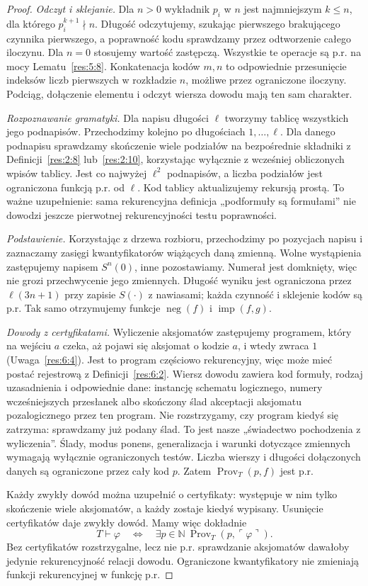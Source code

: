 \documentclass[11pt,a4paper]{article}
\numberwithin{equation}{section}
\theoremstyle{plain}
\theoremstyle{definition}
\theoremstyle{remark}
\begin{document}
\begin{proof}
\emph{Odczyt i sklejanie.} Dla $n>0$ wykładnik $p_i$ w $n$ jest najmniejszym $k\le n$, dla którego $p_i^{k+1}\nmid n$. Długość odczytujemy, szukając pierwszego brakującego czynnika pierwszego, a poprawność kodu sprawdzamy przez odtworzenie całego iloczynu. Dla $n=0$ stosujemy wartość zastępczą. Wszystkie te operacje są p.r. na mocy Lematu~\ref{res:5:8}. Konkatenacja kodów $m,n$ to odpowiednie przesunięcie indeksów liczb pierwszych w rozkładzie $n$, możliwe przez ograniczone iloczyny. Podciąg, dołączenie elementu i odczyt wiersza dowodu mają ten sam charakter.

\emph{Rozpoznawanie gramatyki.} Dla napisu długości $\ell$ tworzymy tablicę wszystkich jego podnapisów. Przechodzimy kolejno po długościach $1,\ldots,\ell$. Dla danego podnapisu sprawdzamy skończenie wiele podziałów na bezpośrednie składniki z Definicji~\ref{res:2:8} lub~\ref{res:2:10}, korzystając wyłącznie z wcześniej obliczonych wpisów tablicy. Jest co najwyżej $\ell^2$ podnapisów, a liczba podziałów jest ograniczona funkcją p.r. od $\ell$. Kod tablicy aktualizujemy rekursją prostą. To ważne uzupełnienie: sama rekurencyjna definicja „podformuły są formułami” nie dowodzi jeszcze pierwotnej rekurencyjności testu poprawności.

\emph{Podstawienie.} Korzystając z drzewa rozbioru, przechodzimy po pozycjach napisu i zaznaczamy zasięgi kwantyfikatorów wiążących daną zmienną. Wolne wystąpienia zastępujemy napisem $S^n(0)$, inne pozostawiamy. Numerał jest domknięty, więc nie grozi przechwycenie jego zmiennych. Długość wyniku jest ograniczona przez $\ell(3n+1)$ przy zapisie $S(\cdot)$ z nawiasami; każda czynność i sklejenie kodów są p.r. Tak samo otrzymujemy funkcje $\operatorname{neg}(f)$ i $\operatorname{imp}(f,g)$.

\emph{Dowody z certyfikatami.} Wyliczenie aksjomatów zastępujemy programem, który na wejściu $a$ czeka, aż pojawi się aksjomat o kodzie $a$, i wtedy zwraca $1$ (Uwaga~\ref{res:6:4}). Jest to program częściowo rekurencyjny, więc może mieć postać rejestrową z Definicji~\ref{res:6:2}. Wiersz dowodu zawiera kod formuły, rodzaj uzasadnienia i odpowiednie dane: instancję schematu logicznego, numery wcześniejszych przesłanek albo skończony ślad akceptacji aksjomatu pozalogicznego przez ten program. Nie rozstrzygamy, czy program kiedyś się zatrzyma: sprawdzamy już podany ślad. To jest nasze „świadectwo pochodzenia z wyliczenia”. Ślady, modus ponens, generalizacja i warunki dotyczące zmiennych wymagają wyłącznie ograniczonych testów. Liczba wierszy i długości dołączonych danych są ograniczone przez cały kod $p$. Zatem $\operatorname{Prov}_T(p,f)$ jest p.r.

Każdy zwykły dowód można uzupełnić o certyfikaty: występuje w nim tylko skończenie wiele aksjomatów, a każdy zostaje kiedyś wypisany. Usunięcie certyfikatów daje zwykły dowód. Mamy więc dokładnie
\[
T\vdash\varphi\quad\Longleftrightarrow\quad\exists p\in\mathbb N\ \operatorname{Prov}_T(p,\ulcorner\varphi\urcorner).
\]
Bez certyfikatów rozstrzygalne, lecz nie p.r. sprawdzanie aksjomatów dawałoby jedynie rekurencyjność relacji dowodu. Ograniczone kwantyfikatory nie zmieniają funkcji rekurencyjnej w funkcję p.r.
\end{proof}
\end{document}
